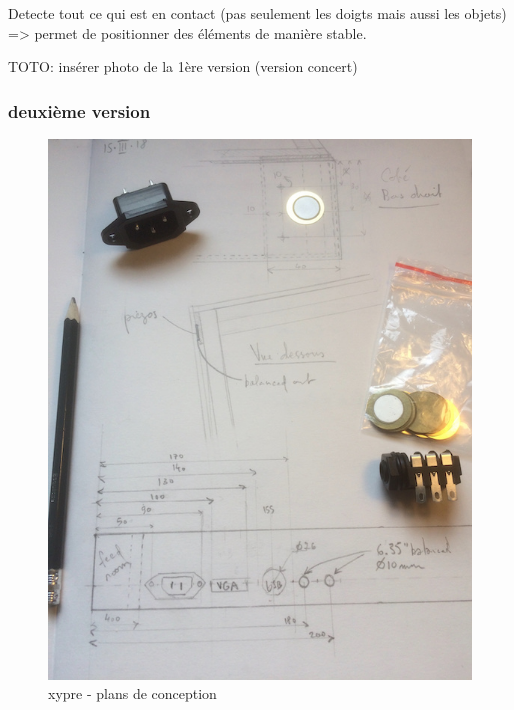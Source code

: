 Detecte tout ce qui est en contact (pas seulement les doigts mais aussi les objets) => permet de positionner des éléments de manière stable.

TOTO: insérer photo de la 1ère version (version concert)

\subsubsection{deuxième version}

\begin{figure}[!htbp]
	\includegraphics[width=\textwidth]{gfx/05_interfaces/Xypre_plan01_72dpi.jpg}
	\caption{xypre - plans de conception}
	\label{fig:interface:xypre_plans}
\end{figure}

